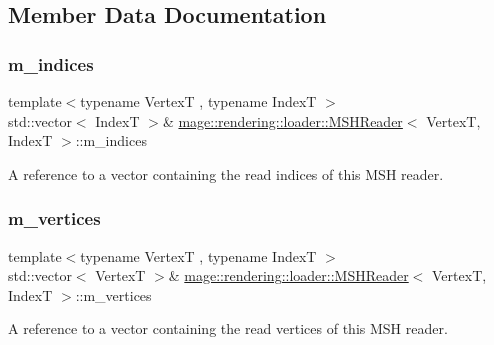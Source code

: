 \subsection{Member Data Documentation}
\mbox{\label{classmage_1_1rendering_1_1loader_1_1_m_s_h_reader_acf3ae948f5bb927a167bbb2e5d618916}} 
\subsubsection{\texorpdfstring{m\+\_\+indices}{m\_indices}}
{\footnotesize\ttfamily template$<$typename VertexT , typename IndexT $>$ \\
std\+::vector$<$ IndexT $>$\& \mbox{\hyperlink{classmage_1_1rendering_1_1loader_1_1_m_s_h_reader}{mage\+::rendering\+::loader\+::\+M\+S\+H\+Reader}}$<$ VertexT, IndexT $>$\+::m\+\_\+indices\hspace{0.3cm}{\ttfamily [private]}}

A reference to a vector containing the read indices of this M\+SH reader. \mbox{\label{classmage_1_1rendering_1_1loader_1_1_m_s_h_reader_a57e5f4e14aecbce999df14d0dcaba4e5}} 
\subsubsection{\texorpdfstring{m\+\_\+vertices}{m\_vertices}}
{\footnotesize\ttfamily template$<$typename VertexT , typename IndexT $>$ \\
std\+::vector$<$ VertexT $>$\& \mbox{\hyperlink{classmage_1_1rendering_1_1loader_1_1_m_s_h_reader}{mage\+::rendering\+::loader\+::\+M\+S\+H\+Reader}}$<$ VertexT, IndexT $>$\+::m\+\_\+vertices\hspace{0.3cm}{\ttfamily [private]}}

A reference to a vector containing the read vertices of this M\+SH reader. 